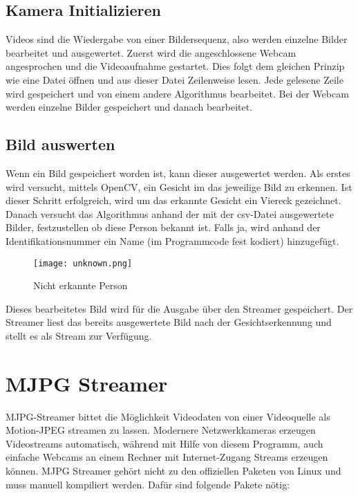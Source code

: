 \subsection{Kamera Initializieren}
Videos sind die Wiedergabe von einer Bildersequenz, also werden einzelne Bilder bearbeitet und ausgewertet.  Zuerst wird die angeschlossene Webcam angesprochen und die Videoaufnahme gestartet. Dies folgt dem gleichen Prinzip wie eine Datei öffnen und aus dieser Datei Zeilenweise lesen. Jede gelesene Zeile wird gespeichert und von einem andere Algorithmus bearbeitet. Bei der Webcam werden einzelne Bilder gespeichert und danach bearbeitet.\\
 
\subsection{Bild auswerten}
 Wenn ein Bild gespeichert worden ist, kann dieser ausgewertet werden. Als erstes wird versucht, mittels OpenCV, ein Gesicht im das jeweilige Bild zu erkennen. Ist dieser Schritt erfolgreich, wird um das erkannte Gesicht ein Viereck gezeichnet. Danach versucht das Algorithmus anhand der mit der csv-Datei ausgewertete Bilder, festzustellen ob diese Person bekannt ist. Falls ja, wird anhand der Identifikationsnummer ein Name (im Programmcode fest kodiert) hinzugefügt. \\


\begin{figure}[h]
  \begin{center}		%
    \texttt{[image: unknown.png]}
  		  \caption{Nicht erkannte Person}
     \label{unknown}
  \end{center}
\end{figure}

Dieses bearbeitetes Bild wird für die Ausgabe über den Streamer gespeichert. Der Streamer liest das bereits ausgewertete Bild nach der Gesichtserkennung und stellt es als Stream zur Verfügung.
 
 
\section{MJPG Streamer}
MJPG-Streamer bittet die Möglichkeit Videodaten von einer Videoquelle als Motion-JPEG streamen zu lassen. Modernere Netzwerkkameras erzeugen Videostreams automatisch, während mit Hilfe von diesem Programm, auch einfache Webcams an einem Rechner mit Internet-Zugang Streams erzeugen können. MJPG Streamer gehört nicht zu den offiziellen Paketen von Linux und muss manuell kompiliert werden. Dafür sind folgende Pakete nötig:

